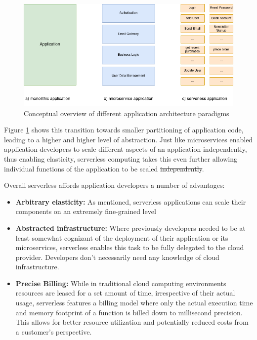 \documentclass[draft,final]{vutinfth} %
\providecommand{\DIFaddtex}[1]{{\protect\color{blue}\uwave{#1}}} %
\providecommand{\DIFdeltex}[1]{{\protect\color{red}\sout{#1}}}                      %
\providecommand{\DIFaddbegin}{} %
\providecommand{\DIFaddend}{} %
\providecommand{\DIFdelbegin}{} %
\providecommand{\DIFdelend}{} %
\providecommand{\DIFadd}[1]{\texorpdfstring{\DIFaddtex{#1}}{#1}} %
\providecommand{\DIFdel}[1]{\texorpdfstring{\DIFdeltex{#1}}{}} %
\begin{document}
\begin{figure}
    \centering
    \includegraphics[width=\columnwidth]{graphics/diagrams/monolith_micro_serverless.drawio.png}
    \caption{Conceptual overview of different application architecture paradigms}
    \label{fig:mono_micro_serverless}
\end{figure}

Figure \ref{fig:mono_micro_serverless} shows this transition towards smaller partitioning of application code, leading to a higher and higher level of abstraction.
Just like microservices enabled application developers to scale different aspects of an application independently, thus enabling elasticity, serverless computing takes this even further allowing individual functions of the application to be scaled \DIFdelbegin \DIFdel{independently}\DIFdelend \DIFaddbegin \DIFadd{separately from each other}\DIFaddend \cite{jonasCloudProgrammingSimplified2019}.

Overall serverless affords application developers a number of advantages:
\begin{itemize}
    \item \textbf{Arbitrary elasticity:} As mentioned, serverless applications can scale their components on an extremely fine-grained level\cite{khandelwalTaureauDeconstructingServerless2020}
    \item \textbf{Abstracted infrastructure:} Where previously developers needed to be at least somewhat cognizant of the deployment of their application or its microservices, serverless enables this task to be fully delegated to the cloud provider. Developers don't necessarily need any knowledge of cloud infrastructure\cite{jonasCloudProgrammingSimplified2019}.
    \item \textbf{Precise Billing:} While in traditional cloud computing environments resources are leased for a set amount of time, irrespective of their actual usage\cite{khandelwalTaureauDeconstructingServerless2020}, serverless features a billing model where only the actual execution time and memory footprint of a function is billed down to millisecond precision\cite{jonasCloudProgrammingSimplified2019}. This allows for better resource utilization and potentially reduced costs from a customer's perspective\cite{khandelwalTaureauDeconstructingServerless2020}.
\end{itemize}
\end{document}
